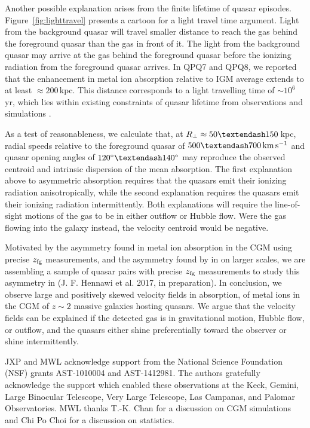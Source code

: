 \documentclass[iop]{emulateapj}
\begin{document}
Another possible explanation arises from the finite lifetime of quasar episodes. 
Figure~\ref{fig:lighttravel} presents a cartoon for a light travel time argument. Light from the 
background quasar will travel smaller distance to reach the gas behind the foreground quasar 
than the gas in front of it. The light from the background quasar may arrive at the gas behind 
the foreground quasar before the ionizing radiation from the foreground quasar arrives. In 
QPQ7 and QPQ8, we reported that the enhancement in metal ion absorption relative to IGM average 
extends to at least $\approx200$\,kpc. This distance corresponds to a light travelling time of 
$\sim10^6$\,yr, which lies within existing constraints of quasar lifetime from observations 
\citep[e.g.][]{Martini04} and simulations \citep[e.g.][]{Hopkins+05}. 

As a test of reasonableness, we calculate that, at $R_\perp\approx50\textendash150$\,kpc, radial 
speeds relative to the foreground quasar of $500\textendash700\,{\rm km\,s^{-1}}$ and quasar 
opening angles of $120^\circ\textendash140^\circ$ may reproduce the observed centroid and 
intrinsic dispersion of the  mean absorption. The first explanation above to asymmetric 
absorption requires that the quasars emit their ionizing radiation anisotropically, while the 
second explanation requires the quasars emit their ionizing radiation intermittently. Both 
explanations will require the line-of-sight motions of the gas to be in either outflow or Hubble 
flow. Were the gas flowing into the galaxy instead, the velocity centroid would be negative. 

Motivated by the asymmetry found in metal ion absorption in the CGM using precise $z_{\rm fg}$ 
measurements, and the asymmetry found by \cite{KirkmanTytler08} in  on larger 
scales, we are assembling a sample of quasar pairs with precise $z_{\rm fg}$ measurements to study 
this asymmetry in  (J. F. Hennawi et al. 2017, in preparation). In conclusion, we 
observe large and positively skewed velocity fields in absorption, of metal ions 
in the CGM of $z\sim2$ massive galaxies hosting quasars. We argue that the velocity fields can be 
explained if the detected gas is in gravitational motion, Hubble flow, or outflow, and the quasars 
either shine preferentially toward the observer or shine intermittently. 

\acknowledgements

JXP and MWL acknowledge support from the National Science Foundation (NSF) grants AST-1010004 and 
AST-1412981. The authors gratefully acknowledge the support which enabled these observations at 
the Keck, Gemini, Large Binocular Telescope, Very Large Telescope, Las Campanas, and Palomar 
Observatories. MWL thanks T.-K. Chan for a discussion on CGM simulations and Chi Po Choi for a 
discussion on statistics. 
\end{document}
